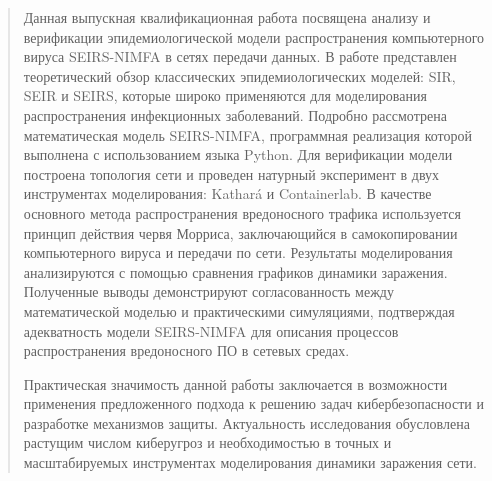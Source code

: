 \begin{abstract}
  
Данная выпускная квалификационная работа посвящена анализу и верификации эпидемиологической модели распространения компьютерного вируса SEIRS-NIMFA в сетях передачи данных. В работе представлен теоретический обзор классических эпидемиологических моделей: SIR, SEIR и SEIRS, которые широко применяются для моделирования распространения инфекционных заболеваний. Подробно рассмотрена математическая модель SEIRS-NIMFA, программная реализация которой выполнена с использованием языка Python. Для верификации модели построена топология сети и проведен натурный эксперимент в двух инструментах моделирования: Kathará и Containerlab. В качестве основного метода распространения вредоносного трафика используется принцип действия червя Морриса, заключающийся в самокопировании компьютерного вируса и передачи по сети. Результаты моделирования анализируются с помощью сравнения графиков динамики заражения. Полученные выводы демонстрируют согласованность между математической моделью и практическими симуляциями, подтверждая адекватность модели SEIRS-NIMFA для описания процессов распространения вредоносного ПО в сетевых средах.

Практическая значимость данной работы заключается в возможности применения предложенного подхода к решению задач кибербезопасности и разработке механизмов защиты. Актуальность исследования обусловлена ​​растущим числом киберугроз и необходимостью в точных и масштабируемых инструментах моделирования динамики заражения сети.

\end{abstract}

